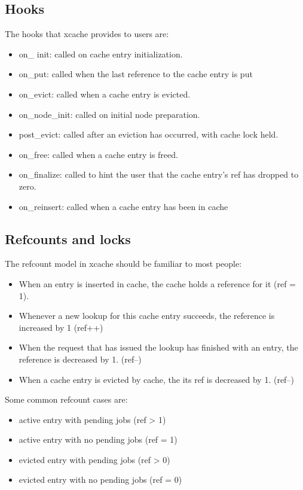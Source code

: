 \subsection{Hooks}

The hooks that xcache provides to users are:

\begin{itemize}
	\item on\_ init: called on cache entry initialization.
	\item on\_put: called when the last reference to the cache entry is put
	\item on\_evict: called when a cache entry is evicted.
	\item on\_node\_init: called on initial node preparation.
	\item post\_evict: called after an eviction has occurred, with cache  
		lock held.
	\item on\_free: called when a cache entry is freed.
	\item on\_finalize: called to hint the user that the cache entry's ref 
		has dropped to zero.
	\item on\_reinsert: called when a cache entry has been in cache
\end{itemize}

\subsection{Refcounts and locks}

The refcount model in xcache should be familiar to most people:

\begin{itemize}
	\item When an entry is inserted in cache, the cache holds a reference 
		for it (ref = 1).
	\item Whenever a new lookup for this cache entry succeeds, the reference 
		is increased by 1 (ref++)
	\item When the request that has issued the lookup has finished with an 
		entry, the reference is decreased by 1. (ref--)
	\item When a cache entry is evicted by cache, the its ref is decreased 
		by 1. (ref--)
\end{itemize}

Some common refcount cases are:

\begin{itemize}
	\item active entry with pending jobs (ref > 1)
	\item active entry with no pending jobs (ref = 1)
	\item evicted entry with pending jobs (ref > 0)
	\item evicted entry with no pending jobs (ref = 0)
\end{itemize}

